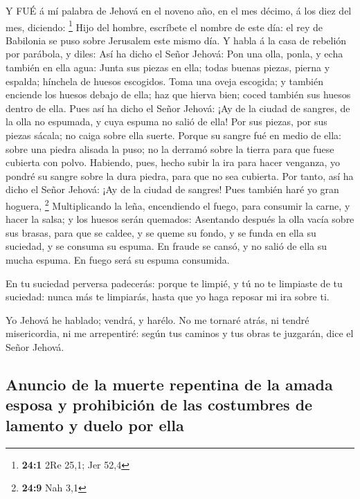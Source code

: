  Y FUÉ á mí palabra de Jehová en el noveno año, en el mes
décimo, á los diez del mes, diciendo: \footnote{\textbf{24:1} 2Re 25,1;
  Jer 52,4}  Hijo del hombre, escríbete el nombre de este
día: el rey de Babilonia se puso sobre Jerusalem este mismo día.
 Y habla á la casa de rebelión por parábola, y diles: Así ha
dicho el Señor Jehová: Pon una olla, ponla, y echa también en ella agua:
 Junta sus piezas en ella; todas buenas piezas, pierna y
espalda; hínchela de huesos escogidos.  Toma una oveja
escogida; y también enciende los huesos debajo de ella; haz que hierva
bien; coced también sus huesos dentro de ella.  Pues así ha
dicho el Señor Jehová: ¡Ay de la ciudad de sangres, de la olla no
espumada, y cuya espuma no salió de ella! Por sus piezas, por sus piezas
sácala; no caiga sobre ella suerte.  Porque su sangre fué en
medio de ella: sobre una piedra alisada la puso; no la derramó sobre la
tierra para que fuese cubierta con polvo.  Habiendo, pues,
hecho subir la ira para hacer venganza, yo pondré su sangre sobre la
dura piedra, para que no sea cubierta.  Por tanto, así ha
dicho el Señor Jehová: ¡Ay de la ciudad de sangres! Pues también haré yo
gran hoguera, \footnote{\textbf{24:9} Nah 3,1} 
Multiplicando la leña, encendiendo el fuego, para consumir la carne, y
hacer la salsa; y los huesos serán quemados:  Asentando
después la olla vacía sobre sus brasas, para que se caldee, y se queme
su fondo, y se funda en ella su suciedad, y se consuma su espuma.
 En fraude se cansó, y no salió de ella su mucha espuma. En
fuego será su espuma consumida.

 En tu suciedad perversa padecerás: porque te limpié, y tú
no te limpiaste de tu suciedad: nunca más te limpiarás, hasta que yo
haga reposar mi ira sobre ti.

 Yo Jehová he hablado; vendrá, y harélo. No me tornaré
atrás, ni tendré misericordia, ni me arrepentiré: según tus caminos y
tus obras te juzgarán, dice el Señor Jehová.

\hypertarget{anuncio-de-la-muerte-repentina-de-la-amada-esposa-y-prohibiciuxf3n-de-las-costumbres-de-lamento-y-duelo-por-ella}{%
\subsection{Anuncio de la muerte repentina de la amada esposa y
prohibición de las costumbres de lamento y duelo por
ella}\label{anuncio-de-la-muerte-repentina-de-la-amada-esposa-y-prohibiciuxf3n-de-las-costumbres-de-lamento-y-duelo-por-ella}}

